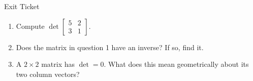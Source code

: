 \documentclass[10pt]{article}
\begin{document}
\namedateperiod

\vspace{0.12in}

\begin{notesbox}{Exit Ticket}
\begin{enumerate}[leftmargin=1.5em, itemsep=6pt]

    \item Compute $\det\begin{bmatrix}5&2\\3&1\end{bmatrix}$.
          \vspace{0.55in}

    \item Does the matrix in question 1 have an inverse? If so, find it.
          \vspace{1.1in}

    \item A $2\times2$ matrix has $\det = 0$. What does this mean geometrically
          about its two column vectors?
          \writeline
          \writeline

\end{enumerate}
\end{notesbox}
\end{document}
